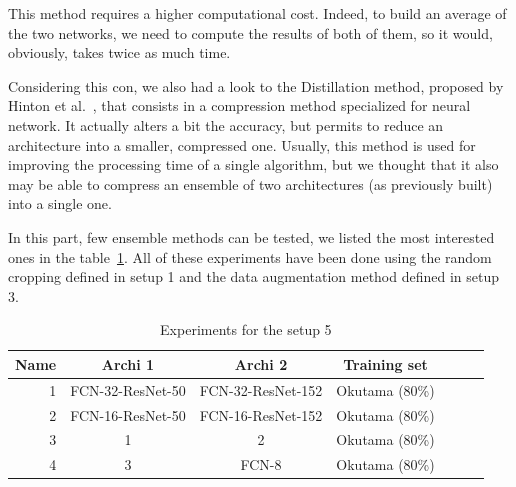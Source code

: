 This method requires a higher computational cost. Indeed, to build an average of the two networks, we need to compute the results of both of them, so it would, obviously, takes twice as much time.

Considering this con, we also had a look to the Distillation method, proposed by Hinton et al.~\cite{HINT15}, that consists in a compression method specialized for neural network. It actually alters a bit the accuracy, but permits to reduce an architecture into a smaller, compressed one. Usually, this method is used for improving the processing time of a single algorithm, but we thought that it also may be able to compress an ensemble of two architectures (as previously built) into a single one.

In this part, few ensemble methods can be tested, we listed the most interested ones in the table~\ref{part3:setup5}. All of these experiments have been done using the random cropping defined in setup 1 and the data augmentation method defined in setup 3.

\begin{table}[ht!]
  \centering
  
  \begin{tabular}{rcccccc}
  \rowcolor{gray!50}
  \toprule
  \textbf{Name} & \textbf{Archi 1} & \textbf{Archi 2} & \textbf{Training set} \\
  \midrule
  1 & FCN-32-ResNet-50 & FCN-32-ResNet-152 & Okutama (80\%) \\
  2 & FCN-16-ResNet-50 & FCN-16-ResNet-152 & Okutama (80\%) \\
  3 & 1 & 2 & Okutama (80\%) \\
  4 & 3 & FCN-8 & Okutama (80\%) \\
  \bottomrule
  \end{tabular}%
  \caption{Experiments for the setup 5}
  \label{part3:setup5}
\end{table}%

